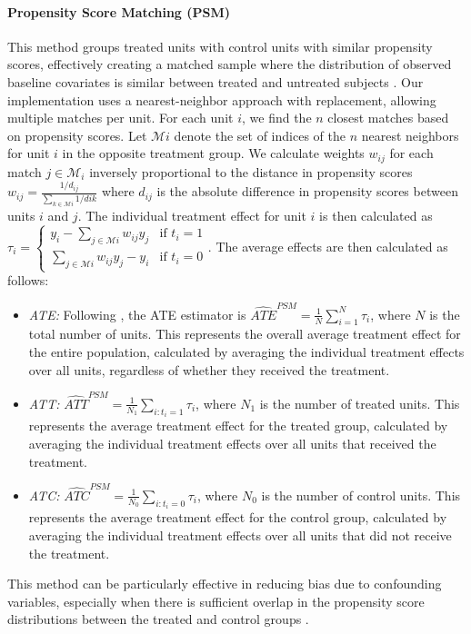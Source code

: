 \documentclass{article}
\begin{document}
\paragraph{Propensity Score Matching (PSM)} This method groups treated units with control units with similar propensity scores, effectively creating a matched sample where the distribution of observed baseline covariates is similar between treated and untreated subjects \citep{austin2011introduction}. Our implementation uses a nearest-neighbor approach with replacement, allowing multiple matches per unit. For each unit $i$, we find the $n$ closest matches based on propensity scores. Let $\mathcal{M}i$ denote the set of indices of the $n$ nearest neighbors for unit $i$ in the opposite treatment group. We calculate weights $w_{ij}$ for each match $j \in \mathcal{M}_i$ inversely proportional to the distance in propensity scores 
$w_{ij} = \frac{1/d_{ij}}{\sum_{k \in \mathcal{M}i} 1/d{ik}}$
where $d_{ij}$ is the absolute difference in propensity scores between units $i$ and $j$. The individual treatment effect for unit $i$ is then calculated as
$\tau_i = \begin{cases}
y_i - \sum_{j \in \mathcal{M}i} w_{ij}y_j & \text{if } t_i = 1 \\
\sum_{j \in \mathcal{M}i} w_{ij}y_j - y_i & \text{if } t_i = 0
\end{cases}
$.
The average effects are then calculated as follows:
\begin{itemize}
\item \textit{ATE:} Following \citet{basu2023understanding}, the ATE estimator is $\widehat{ATE}^{PSM} = \frac{1}{N} \sum_{i=1}^N \tau_i$, where $N$ is the total number of units. This represents the overall average treatment effect for the entire population, calculated by averaging the individual treatment effects over all units, regardless of whether they received the treatment.

\item \textit{ATT:} $\widehat{ATT}^{PSM} = \frac{1}{N_1} \sum_{i:t_i=1} \tau_i$, where $N_1$ is the number of treated units. This represents the average treatment effect for the treated group, calculated by averaging the individual treatment effects over all units that received the treatment.

\item \textit{ATC:} $\widehat{ATC}^{PSM} = \frac{1}{N_0} \sum_{i:t_i=0} \tau_i$, where $N_0$ is the number of control units. This represents the average treatment effect for the control group, calculated by averaging the individual treatment effects over all units that did not receive the treatment.

\end{itemize}
This method can be particularly effective in reducing bias due to confounding variables, especially when there is sufficient overlap in the propensity score distributions between the treated and control groups \citep{rosenbaum1983central}.
\end{document}
